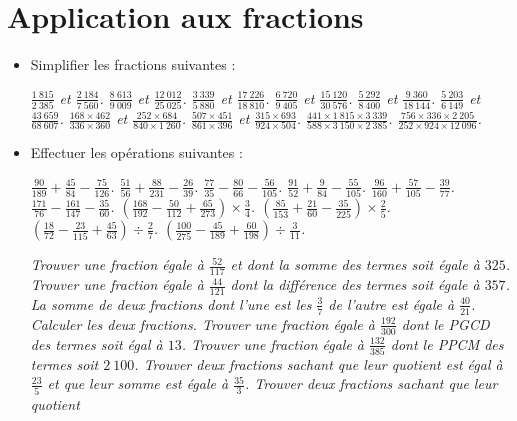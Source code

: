 
 \chapter{Application aux fractions} 
 \begin{itemize}
 \item Simplifier les fractions suivantes : 
 \begin{itemize}
 \it $\frac{1~815}{2~385}$ et $\frac{2~184}{7~560}$.
 \it $\frac{8~613}{9~009}$ et $\frac{12~012}{25~025}$.
 \it $\frac{3~339}{5~880}$ et $\frac{17~226}{18~810}$.
 \it $\frac{6~720}{9~405}$ et $\frac{15~120}{30~576}$.
 \it $\frac{5~292}{8~400}$ et $\frac{9~360}{18~144}$. 
 \it $\frac{5~203}{6~149}$ et $\frac{43~659}{68~607}$.
 \it $\frac{168\times462}{336\times360}$ et $\frac{252\times684}{840\times1~260}$. 
 \it $\frac{507\times 451}{861\times 396}$ et $\frac{315\times 693}{924\times 504}$. 
 \it $\frac{441\times 1~815\times 3~339}{588\times 3~150\times 2~385}$. 
 \it $\frac{756\times 336\times 2~205}{252\times 924\times12~096}$. 
 \end{itemize}
 \item Effectuer les opérations suivantes : 
 \begin{itemize}
 \it $\frac{90}{189}+\frac{45}{84}-\frac{75}{126}$.
 \it $\frac{51}{56}+\frac{88}{231}-\frac{26}{39}$.
 \it $\frac{77}{35}-\frac{80}{66}-\frac{56}{105}$. 
 \it $\frac{91}{52}+\frac9{84}-\frac{55}{105}$.
 \it $\frac{96}{160}+\frac{57}{105}-\frac{39}{77}$. 
 \it $\frac{171}{76} -\frac{161}{147} - \frac{35}{60}$.
 \it $\left(\frac{168}{192}-\frac{50}{112}+\frac{65}{273}\right)\times \frac34$.
 \it $\left(\frac{85}{153}+\frac{21}{60}-\frac{35}{225}\right)\times \frac25$. 
 \it $\left(\frac{18}{72}-\frac{23}{115}+\frac{45}{63}\right)\div \frac27$.
 \it $\left(\frac{100}{275}-\frac{45}{189}+\frac{60}{198}\right)\div\frac3{11}$. 
 \end{itemize}
 \it Trouver une fraction égale à $\frac{52}{117}$ et dont la somme des termes soit égale à $325$.
 \it Trouver une fraction égale à $\frac{44}{121}$ dont la différence des termes soit égale à $357$. 
 \it La somme de deux fractions dont l'une est les $\frac37$ de l'autre est égale à $\frac{40}{21}$. Calculer
 les deux fractions.
 \it Trouver une fraction égale à $\frac{192}{300}$ dont le PGCD des termes soit égal à $13$. 
 \it Trouver une fraction égale à $\frac{132}{385}$ dont
 le PPCM des termes soit $2~100$. 
 \it Trouver deux fractions sachant que leur quotient est égal à $\frac{23}5$ et que leur somme est égale à $\frac{35}3$.
 \it Trouver deux fractions sachant que leur quotient

\end{itemize}
